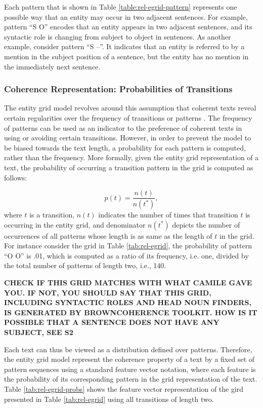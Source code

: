 Each pattern that is shown in Table \ref{table:rel-egrid-pattern} represents one possible way that an entity may occur in two adjacent sentences. 
For example, pattern ``S O'' encodes that an entity appears in two adjacent sentences, and its syntactic role is changing from subject to object in sentences. 
As another example, consider pattern ``S --''. 
It indicates that an entity is referred to by a mention in the subject position of a sentence, but the entity has no mention in the immediately next sentence. 

\subsubsection{Coherence Representation: Probabilities of Transitions}
%
The entity grid model revolves around this assumption that coherent texts reveal certain regularities over the frequency of transitions or patterns \cite{barzilay05a,barzilay08}.    
The frequency of patterns can be used as an indicator to the preference of coherent texts in using or avoiding certain transitions. 
However, in order to prevent the model to be biased towards the text length, a probability for each pattern is computed, rather than the frequency. 	 
More formally, given the entity grid representation of a text, the probability of occurring a transition pattern in the grid is computed as follows:

\begin{equation}
p(t) = \frac{n(t)}{n(t^*)},
\end{equation}
where $t$ is a transition, $n(t)$ indicates the number of times that transition $t$ is occurring in the entity grid, and denominator $n(t^*)$ depicts the number of occurrences of all patterns whose length is as same as the length of $t$ in the grid. 
For instance consider the grid in Table \ref{tab:rel-egrid}, the probability of pattern ``O O'' is .01, which is computed as a ratio of its frequency, i.e. one, divided by the total number of patterns of length two, i.e., 140. 

\textbf{CHECK IF THIS GRID MATCHES WITH WHAT CAMILE GAVE YOU. IF NOT, YOU SHOULD SAY THAT THIS GRID, INCLUDING SYNTACTIC ROLES AND HEAD NOUN FINDERS, IS GENERATED BY BROWNCOHERENCE TOOLKIT. 
HOW IS IT POSSIBLE THAT A SENTENCE DOES NOT HAVE ANY SUBJECT, SEE S2}   

Each text can thus be viewed as a distribution defined over patterns. 
Therefore, the entity grid model represent the coherence property of a text by a fixed set of pattern sequences using a standard feature vector notation, where each feature is the probability of its corresponding pattern in the grid representation of the text.  
Table \ref{tab:rel-egrid-probs} shows the feature vector representation of the gird presented in Table \ref{tab:rel-egrid} using all transitions of length two. 

